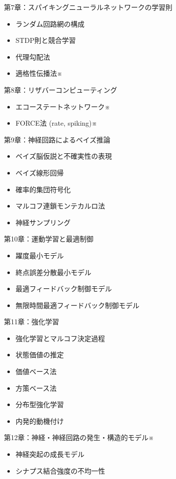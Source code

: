 第7章：スパイキングニューラルネットワークの学習則
\begin{itemize}
\item ランダム回路網の構成
\item STDP則と競合学習
\item 代理勾配法
\item 適格性伝播法※
\end{itemize}
第8章：リザバーコンピューティング
\begin{itemize}
\item エコーステートネットワーク※
\item FORCE法 (rate, spiking)※
\end{itemize}
第9章：神経回路によるベイズ推論
\begin{itemize}
\item ベイズ脳仮説と不確実性の表現
\item ベイズ線形回帰
\item 確率的集団符号化
\item マルコフ連鎖モンテカルロ法
\item 神経サンプリング
\end{itemize}
第10章：運動学習と最適制御
\begin{itemize}
\item 躍度最小モデル
\item 終点誤差分散最小モデル
\item 最適フィードバック制御モデル
\item 無限時間最適フィードバック制御モデル
\end{itemize}
第11章：強化学習
\begin{itemize}
\item 強化学習とマルコフ決定過程
\item 状態価値の推定
\item 価値ベース法
\item 方策ベース法
\item 分布型強化学習
\item 内発的動機付け
\end{itemize}
第12章：神経・神経回路の発生・構造的モデル※
\begin{itemize}
\item 神経突起の成長モデル
\item シナプス結合強度の不均一性
\end{itemize}
